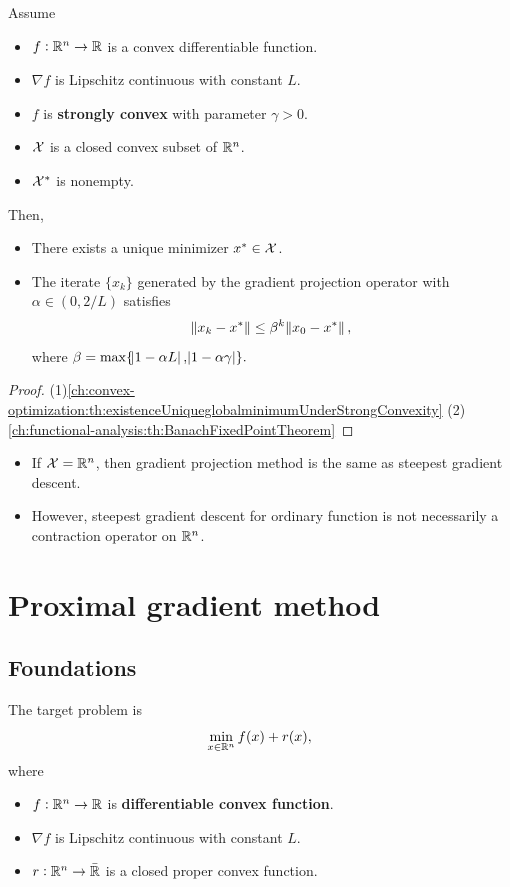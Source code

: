 \begin{refsection}
\begin{lemma}
Assume
\begin{itemize}
	\item $f:\mathbb{R}^n\to \mathbb{R}$ is a convex differentiable function.
	\item $\nabla f$ is Lipschitz continuous with constant $L$.
	\item $f$ is \textbf{strongly convex} with parameter $\gamma > 0$.
	\item $\mathcal{X}$ is a closed convex subset of $\mathbb{R}^n$.
	\item $\mathcal{X}^*$ is nonempty.
\end{itemize}	
Then,
\begin{itemize}
	\item There exists a unique minimizer $x^*\in\mathcal{X}$.
	\item The iterate $\{x_k\}$ generated by the gradient projection operator with $\alpha\in (0,2/L)$ satisfies
	$$\norm{x_k - x^*} \leq \beta^k \norm{x_0 - x^*},$$
	where $\beta= \max\{\abs{1-\alpha L},\abs{1-\alpha \gamma}\}.$
\end{itemize}
\end{lemma}
\begin{proof}
(1)\autoref{ch:convex-optimization:th:existenceUniqueglobalminimumUnderStrongConvexity}
(2)\autoref{ch:functional-analysis:th:BanachFixedPointTheorem}
\end{proof}


\begin{remark}\hfill
\begin{itemize}
	\item If $\mathcal{X} = \mathbb{R}^n$, then gradient projection method is the same as steepest gradient descent.
	\item However, steepest gradient descent for ordinary function is not necessarily a contraction operator on $\mathbb{R}^n$.
\end{itemize}
\end{remark}



\section{Proximal gradient method}
\subsection{Foundations}
\begin{definition}
	The target problem is
	$$\min_{x\in\mathbb{R}^n} f(x) + r(x),$$
	where
	\begin{itemize}
		\item $f:\mathbb{R}^n\to \mathbb{R}$ is \textbf{differentiable convex function}.
		\item $\nabla f$ is Lipschitz continuous with constant $L$.
		\item $r: \mathbb{R}^n \to \bar{\mathbb{R}}$ is a closed proper convex function.
	\end{itemize}
\end{definition}


\end{refsection}
